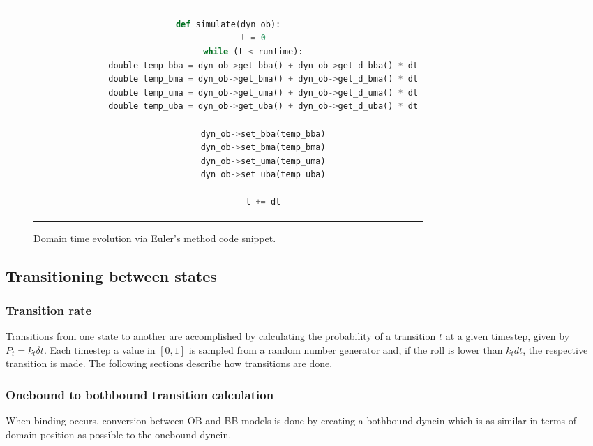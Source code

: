 \documentclass[
11pt, %
english, %
singlespacing, %
headsepline, %
chapterinoneline, %
]{MastersDoctoralThesis} %
\begin{document}
\begin{figure}[h!]
  \centering
  \begin{tabular}{c}
    \begin{lstlisting}[language=python]
      def simulate(dyn_ob):
          t = 0
          while (t < runtime):
              double temp_bba = dyn_ob->get_bba() + dyn_ob->get_d_bba() * dt
              double temp_bma = dyn_ob->get_bma() + dyn_ob->get_d_bma() * dt
              double temp_uma = dyn_ob->get_uma() + dyn_ob->get_d_uma() * dt
              double temp_uba = dyn_ob->get_uba() + dyn_ob->get_d_uba() * dt
              
              dyn_ob->set_bba(temp_bba)
              dyn_ob->set_bma(temp_bma)
              dyn_ob->set_uma(temp_uma)
              dyn_ob->set_uba(temp_uba)
              
              t += dt
    \end{lstlisting}
  \end{tabular}
  \caption{Domain time evolution via Euler's method code snippet.}{}
  \label{snip:euler-code-snippet}
\end{figure}

\subsection{Transitioning between states}

\subsubsection{Transition rate}
\label{sec:transitioning-states}
Transitions from one state to another are accomplished by calculating the probability of a transition $t$ at a given timestep, given by $P_{t} = k_t\delta t$. Each timestep a value in $[0,1]$ is sampled from a random number generator and, if the roll is lower than $k_tdt$, the respective transition is made. The following sections describe how transitions are done.\\

\subsubsection{Onebound to bothbound transition calculation}
When binding occurs, conversion between OB and BB models is done by creating a bothbound dynein which is as similar in terms of domain position as possible to the onebound dynein.\\
\end{document}
